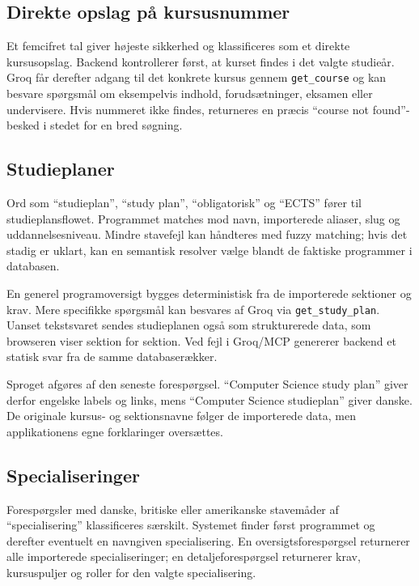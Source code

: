 \documentclass[11pt,a4paper]{article}
\newcommand{\code}[1]{\texttt{#1}}
\begin{document}
\subsection{Direkte opslag på kursusnummer}

Et femcifret tal giver højeste sikkerhed og klassificeres som et direkte
kursusopslag. Backend kontrollerer først, at kurset findes i det valgte
studieår. Groq får derefter adgang til det konkrete kursus gennem
\code{get\_course} og kan besvare spørgsmål om eksempelvis indhold,
forudsætninger, eksamen eller undervisere. Hvis nummeret ikke findes,
returneres en præcis ``course not found''-besked i stedet for en bred søgning.

\subsection{Studieplaner}

Ord som ``studieplan'', ``study plan'', ``obligatorisk'' og ``ECTS'' fører til
studieplansflowet. Programmet matches mod navn, importerede aliaser, slug og
uddannelsesniveau. Mindre stavefejl kan håndteres med fuzzy matching; hvis det
stadig er uklart, kan en semantisk resolver vælge blandt de faktiske programmer
i databasen.

En generel programoversigt bygges deterministisk fra de importerede sektioner
og krav. Mere specifikke spørgsmål kan besvares af Groq via
\code{get\_study\_plan}. Uanset tekstsvaret sendes studieplanen også som
strukturerede data, som browseren viser sektion for sektion. Ved fejl i
Groq/MCP genererer backend et statisk svar fra de samme databaserækker.

Sproget afgøres af den seneste forespørgsel. ``Computer Science study plan''
giver derfor engelske labels og links, mens ``Computer Science studieplan''
giver danske. De originale kursus- og sektionsnavne følger de importerede data,
men applikationens egne forklaringer oversættes.

\subsection{Specialiseringer}

Forespørgsler med danske, britiske eller amerikanske stavemåder af
``specialisering'' klassificeres særskilt. Systemet finder først programmet og
derefter eventuelt en navngiven specialisering. En oversigtsforespørgsel
returnerer alle importerede specialiseringer; en detaljeforespørgsel returnerer
krav, kursuspuljer og roller for den valgte specialisering.
\end{document}

